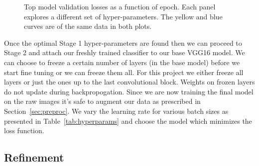 \documentclass[12pt,journal,compsoc]{IEEEtran}
\begin{document}
\begin{figure}%
\normalsize
{}
\caption{Top model validation losses as a function of epoch. Each panel explores a different set of hyper-parameters. The yellow and blue curves are of the same data in both plots.}
\label{fig:top1_pp_pl_sz}
\vspace*{1pt}
\end{figure}

Once the optimal Stage 1 hyper-parameters are found then we can proceed to Stage 2 and attach our freshly trained classifier to our base VGG16 model. We can choose to freeze a certain number of layers (in the base model) before we start fine tuning or we can freeze them all. For this project we either freeze all layers or just the ones up to the last convolutional block. Weights on frozen layers do not update during backpropogation. Since we are now training the final model on the raw images it's safe to augment our data as prescribed in Section~\ref{sec:preproc}. We vary the learning rate for various batch sizes as presented in Table~\ref{tab:hyperparams} and choose the model which minimizes the loss function. 

\subsection{Refinement}\label{refine}

\end{document}
